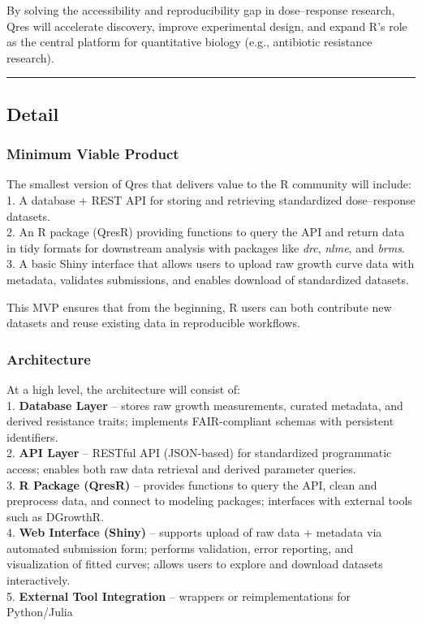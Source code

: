 \documentclass[
  letterpaper,
  DIV=11,
  numbers=noendperiod]{scrartcl}
\begin{document}
By solving the accessibility and reproducibility gap in dose--response
research, Qres will accelerate discovery, improve experimental design,
and expand R's role as the central platform for quantitative biology
(e.g., antibiotic resistance research).

\begin{center}\rule{0.5\linewidth}{0.5pt}\end{center}

\subsection{Detail}\label{detail}

\subsubsection{Minimum Viable Product}\label{minimum-viable-product}

The smallest version of Qres that delivers value to the R community will
include:\\
1. A database + REST API for storing and retrieving standardized
dose--response datasets.\\
2. An R package (QresR) providing functions to query the API and return
data in tidy formats for downstream analysis with packages like
\emph{drc}, \emph{nlme}, and \emph{brms}.\\
3. A basic Shiny interface that allows users to upload raw growth curve
data with metadata, validates submissions, and enables download of
standardized datasets.

This MVP ensures that from the beginning, R users can both contribute
new datasets and reuse existing data in reproducible workflows.

\subsubsection{Architecture}\label{architecture}

At a high level, the architecture will consist of:\\
1. \textbf{Database Layer} -- stores raw growth measurements, curated
metadata, and derived resistance traits; implements FAIR-compliant
schemas with persistent identifiers.\\
2. \textbf{API Layer} -- RESTful API (JSON-based) for standardized
programmatic access; enables both raw data retrieval and derived
parameter queries.\\
3. \textbf{R Package (QresR)} -- provides functions to query the API,
clean and preprocess data, and connect to modeling packages; interfaces
with external tools such as DGrowthR.\\
4. \textbf{Web Interface (Shiny)} -- supports upload of raw data +
metadata via automated submission form; performs validation, error
reporting, and visualization of fitted curves; allows users to explore
and download datasets interactively.\\
5. \textbf{External Tool Integration} -- wrappers or reimplementations
for Python/Julia
\end{document}
